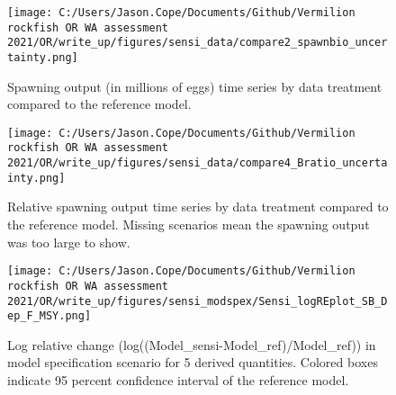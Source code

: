 \documentclass[11pt,
  english,
  a4paper,
]{article}
\begin{document}
\tagmcend\tagstructend


\begin{figure}
\centering
\texttt{[image: C:/Users/Jason.Cope/Documents/Github/Vermilion rockfish OR WA assessment 2021/OR/write\_up/figures/sensi\_data/compare2\_spawnbio\_uncertainty.png]}
\caption{Spawning output (in millions of eggs) time series by data treatment compared to the reference model.\label{fig:sensi-data-ssb}}
\end{figure}

\tagmcend\tagstructend


\begin{figure}
\centering
\texttt{[image: C:/Users/Jason.Cope/Documents/Github/Vermilion rockfish OR WA assessment 2021/OR/write\_up/figures/sensi\_data/compare4\_Bratio\_uncertainty.png]}
\caption{Relative spawning output time series by data treatment compared to the reference model. Missing scenarios mean the spawning output was too large to show.\label{fig:sensi-data-depl}}
\end{figure}

\tagmcend\tagstructend


\begin{figure}
\centering
\texttt{[image: C:/Users/Jason.Cope/Documents/Github/Vermilion rockfish OR WA assessment 2021/OR/write\_up/figures/sensi\_modspex/Sensi\_logREplot\_SB\_Dep\_F\_MSY.png]}
\caption{Log relative change (log((Model\_sensi-Model\_ref)/Model\_ref)) in model specification scenario for 5 derived quantities. Colored boxes indicate 95 percent confidence interval of the reference model.\label{fig:sensi-modspec-RE}}
\end{figure}

\tagmcend\tagstructend
\end{document}
